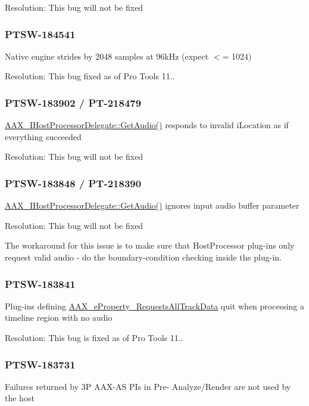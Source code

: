 Resolution\+: This bug will not be fixed\hypertarget{a00846_PTSW-184541}{}\subsubsection{P\+T\+S\+W-\/184541}\label{a00846_PTSW-184541}
Native engine strides by 2048 samples at 96k\+Hz (expect $<$= 1024)

Resolution\+: This bug fixed as of Pro Tools 11..\hypertarget{a00846_PTSW-183902}{}\subsubsection{P\+T\+S\+W-\/183902 / P\+T-\/218479}\label{a00846_PTSW-183902}
\mbox{\hyperlink{a01837_ae083d877253163dd367f46c7c491e9e3}{A\+A\+X\+\_\+\+I\+Host\+Processor\+Delegate\+::\+Get\+Audio()}} responds to invalid i\+Location as if everything succeeded

Resolution\+: This bug will not be fixed\hypertarget{a00846_PTSW-183848}{}\subsubsection{P\+T\+S\+W-\/183848 / P\+T-\/218390}\label{a00846_PTSW-183848}
\mbox{\hyperlink{a01837_ae083d877253163dd367f46c7c491e9e3}{A\+A\+X\+\_\+\+I\+Host\+Processor\+Delegate\+::\+Get\+Audio()}} ignores input audio buffer parameter

Resolution\+: This bug will not be fixed

The workaround for this issue is to make sure that Host\+Processor plug-\/ins only request valid audio -\/ do the boundary-\/condition checking inside the plug-\/in.\hypertarget{a00846_PTSW-183841}{}\subsubsection{P\+T\+S\+W-\/183841}\label{a00846_PTSW-183841}
Plug-\/ins defining \mbox{\hyperlink{a00662_a13e384f22825afd3db6d68395b79ce0daa59caaf3d7c3e195a32b8cb09a9baac2}{A\+A\+X\+\_\+e\+Property\+\_\+\+Requests\+All\+Track\+Data}} quit when processing a timeline region with no audio

Resolution\+: This bug is fixed as of Pro Tools 11..\hypertarget{a00846_PTSW-183731}{}\subsubsection{P\+T\+S\+W-\/183731}\label{a00846_PTSW-183731}
Failures returned by 3P A\+A\+X-\/\+AS P\+Is in Pre-\/ Analyze/\+Render are not used by the host


